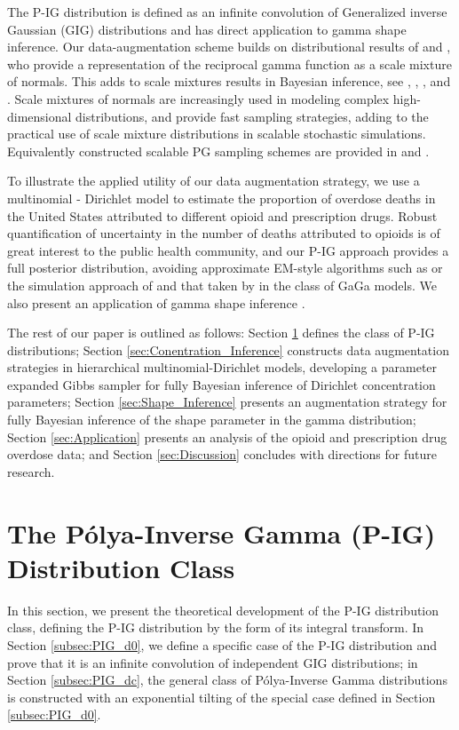 \documentclass{statsoc}
\newcommand{\Polya}{P\'olya}
\begin{document}
The P-IG distribution is defined as an infinite convolution of Generalized inverse Gaussian (GIG) distributions and has direct application to gamma shape inference.  Our data-augmentation scheme builds on distributional results of \cite{hartman1976completely}  and \cite{roynette2005couples}, who provide a representation of the reciprocal gamma function as a scale mixture of normals. This adds to scale mixtures results in Bayesian inference, see \cite{andrews1974scale}, \cite{barndorff1982normal}, \cite{west1987scale}, and \cite{polson2013bayesian}. Scale mixtures of normals are increasingly used in modeling complex high-dimensional distributions, and \cite{bhattacharya2016fast} provide fast sampling strategies, adding to the practical use of scale mixture distributions in scalable stochastic simulations.  Equivalently constructed scalable PG sampling schemes are provided in \cite{windle2014sampling} and \cite{glynn2018bayesian}. 

To illustrate the applied utility of our data augmentation strategy, we use a multinomial - Dirichlet  model to estimate the proportion of overdose deaths in the United States attributed to different opioid and prescription drugs.  Robust quantification of uncertainty in the number of deaths attributed to opioids is of great interest to the public health community, and our P-IG approach provides a full posterior distribution, avoiding approximate EM-style algorithms such as \cite{minka2000estimating} or the simulation approach of \cite{miller2018fast} and that taken by \cite{rossell2009gaga} in the class of GaGa models.  We also present an application of gamma shape inference \citep{west1992hyperparameter, miller2018fast}. 

The rest of our paper is outlined as follows: Section \ref{sec:P-IG} defines the class of P-IG distributions; Section \ref{sec:Conentration_Inference} constructs data augmentation strategies in hierarchical multinomial-Dirichlet models, developing a parameter expanded Gibbs sampler for fully Bayesian inference of Dirichlet concentration parameters; Section \ref{sec:Shape_Inference} presents an augmentation strategy for fully Bayesian inference of the shape parameter in the gamma distribution; Section \ref{sec:Application} presents an analysis of the opioid and prescription drug overdose data; and Section \ref{sec:Discussion} concludes with directions for future research. 

\section{The P\'olya-Inverse Gamma (P-IG) Distribution Class}
\label{sec:P-IG}
In this section, we present the theoretical development of the P-IG distribution class, defining the P-IG distribution by the form of its integral transform.  In Section \ref{subsec:PIG_d0}, we define a specific case of the P-IG distribution and prove that it is an infinite convolution of independent GIG distributions; in Section \ref{subsec:PIG_dc}, the general class of \Polya-Inverse Gamma distributions is constructed with an exponential tilting of the special case defined in Section \ref{subsec:PIG_d0}.         
\end{document}
